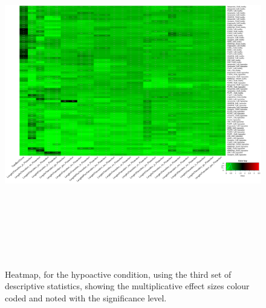 \documentclass[a4paper,12pt]{article}
\begin{document}
\begin{figure}[h!]
\begin{center}
\includegraphics[width=16cm,height=15cm]{DarkApoLow_heatmap_all_DarkApoLow_B1MAP.png}
\caption{Heatmap, for the hypoactive condition, using the third set of descriptive statistics, showing the multiplicative effect sizes colour coded and noted with the significance level.}
\end{center}
\end{figure}
\newpage
\end{document}
